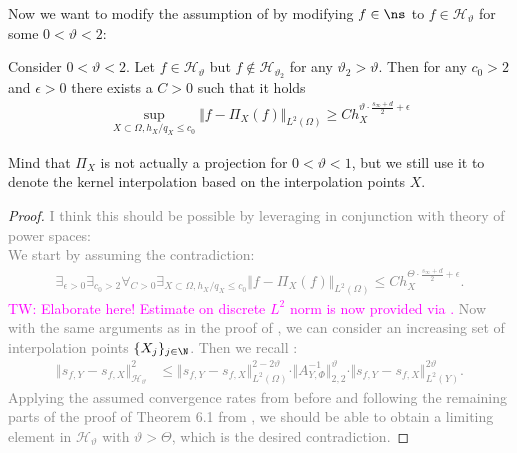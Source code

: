 \documentclass[a4paper, 10pt]{article}
\newcommand{\Ht}{\mathcal{H}_{\vartheta}}
\newcommand{\tw}[1]{\textcolor{magenta}{TW: #1}}
\begin{document}
\noindent Now we want to modify the assumption of  by modifying $f \in \ns$ to $f \in \Ht$ for some $0 < \vartheta < 2$:

\begin{theorem}
\label{th:lower_bound_2}
Consider $0 < \vartheta < 2$.
Let $f \in \Ht$ but $f \notin \mathcal{H}_{\vartheta_2}$ for any $\vartheta_2 > \vartheta$.
Then for any $c_0 > 2$ and $\epsilon > 0$ there exists a $C > 0$ such that it holds 
\begin{align*}
\sup_{X \subset \Omega, h_X / q_X \leq c_0} \Vert f - \Pi_X(f) \Vert_{L^2(\Omega)} \geq C h_X^{\vartheta \cdot \frac{s_\infty + d}{2} + \epsilon}
\end{align*}
\end{theorem}

Mind that $\Pi_X$ is not actually a projection for $0 < \vartheta < 1$, but we still use it to denote the kernel interpolation based on the interpolation points $X$.

\begin{proof}
\textcolor{gray}{I think this should be possible by leveraging  in conjunction with theory of power spaces: \\
We start by assuming the contradiction:
\begin{align*}
\exists_{\epsilon > 0} \exists_{c_0 > 2} \forall_{C>0} \exists_{X \subset \Omega, h_X/q_X \leq c_0} \Vert f - \Pi_X(f) \Vert_{L^2(\Omega)} \leq C h_X^{\Theta \cdot \frac{s_\infty + d}{2} + \epsilon}.
\end{align*}
\tw{Elaborate here! Estimate on discrete $L^2$ norm is now provided via \Cref{prop:disc_L2_from_cont_L2}.}
Now with the same arguments as in the proof of , we can consider an increasing set of interpolation points $\{ X_j \}_{j \in \N}$. Then we recall :
\begin{align*}
\Vert s_{f, Y} - s_{f, X} \Vert_{\Ht}^2 &\leq \Vert s_{f, Y} - s_{f, X} \Vert_{L^2(\Omega)}^{2 - 2\vartheta} \cdot \Vert A_{Y, \Phi}^{-1} \Vert_{2,2}^{\vartheta} \cdot \Vert s_{f, Y} - s_{f, X} \Vert_{L^2(Y)}^{2\vartheta}.
\end{align*}
Applying the assumed convergence rates from before and following the remaining parts of the proof of Theorem 6.1 from \cite{schaback2002inverse}, 
we should be able to obtain a limiting element in $\mathcal{H}_\vartheta$ with $\vartheta > \Theta$, 
which is the desired contradiction.}
\end{proof}
\end{document}

